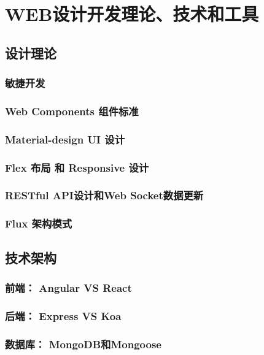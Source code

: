 
\chapter{WEB设计开发理论、技术和工具}
\label{chap:web_dev}

\section{设计理论}
\subsection{敏捷开发}
\subsection{Web Components 组件标准}
\subsection{Material-design UI 设计}
\subsection{Flex 布局 和 Responsive 设计}
\subsection{RESTful API设计和Web Socket数据更新}
\subsection{Flux 架构模式}

\section{技术架构}
\subsection{前端： Angular VS React}
\subsection{后端： Express VS Koa}
\subsection{数据库： MongoDB和Mongoose}
